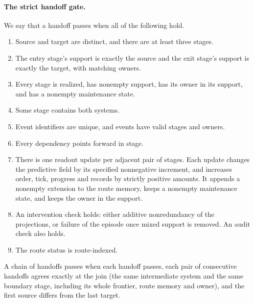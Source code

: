 \paragraph{The strict handoff gate.}
We say that a handoff passes when all of the following hold.
\begin{enumerate}
\item Source and target are distinct, and there are at least three stages.
\item The entry stage's support is exactly the source and the exit stage's
support is exactly the target, with matching owners.
\item Every stage is realized, has nonempty support, has its owner in its
support, and has a nonempty maintenance state.
\item Some stage contains both systems.
\item Event identifiers are unique, and events have valid stages and owners.
\item Every dependency points forward in stage.
\item There is one readout update per adjacent pair of stages. Each update
changes the predictive field by its specified nonnegative increment, and
increases order, tick, progress and records by strictly positive amounts. It appends a nonempty extension to the
route memory, keeps a nonempty maintenance state, and keeps the owner in the
support.
\item An intervention check holds: either additive nonredundancy of the
projections, or failure of the episode once mixed support is removed. An
audit check also holds.
\item The route status is route-indexed.
\end{enumerate}
A chain of handoffs passes when each handoff passes, each pair of consecutive
handoffs agrees exactly at the join (the same intermediate system and the same
boundary stage, including its whole frontier, route memory and owner), and the
first source differs from the last target.

